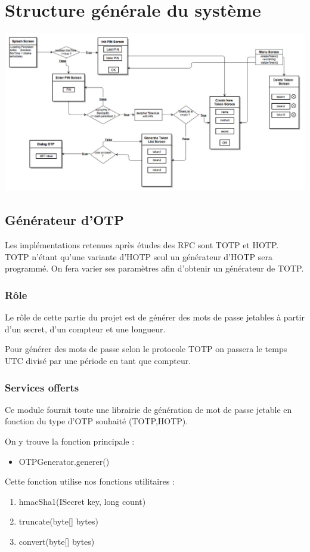 \documentclass{"../../res/univ-projet"}
\begin{document}
\section{Structure générale du système}
\includegraphics[width=\textwidth]{../graphics/uml_android_token.jpg}

\subsection{Générateur d'OTP}
Les implémentations retenues après études des RFC sont TOTP et HOTP. TOTP
n'étant qu'une variante d'HOTP seul un générateur d'HOTP sera programmé.
On fera varier ses paramètres afin d'obtenir un générateur de TOTP.
    \subsubsection{Rôle}
        Le rôle de cette partie du projet est de générer des mots de passe jetables
à partir d'un secret, d'un compteur et une longueur. 

Pour générer des mots de passe selon le protocole TOTP on passera le temps UTC
divisé par une période en tant que compteur.

    \subsubsection{Services offerts}
    Ce module fournit toute une librairie de génération de mot de passe jetable en fonction du type d’OTP souhaité (TOTP,HOTP).

On y trouve la fonction principale :
\begin{itemize}
\item OTPGenerator.generer()
\end{itemize}

\newpage
Cette fonction utilise nos fonctions utilitaires :
\begin{enumerate}
\item hmacSha1(ISecret key, long count)
\item truncate(byte[] bytes)
\item convert(byte[] bytes)
\end{enumerate}
\end{document}
